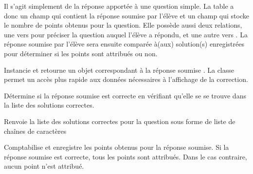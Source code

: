 \documentclass[a4paper,11pt,openany,oneside]{sphinxmanual}
\begin{document}
\begin{fulllineitems}
\label{database:quiz.models.SqSubmit}
Il s'agit simplement de la réponse apportée à une question simple. La table
a donc un champ  qui contient la réponse soumise par l'élève et un champ
 qui stocke le nombre de points obtenus pour la question. Elle possède
aussi deux relations, une vers  pour préciser la question auquel
l'élève a répondu, et une autre vers . La réponse soumise par l'élève
sera ensuite comparée à(aux) solution(s) enregistrées pour déterminer si les points
sont attribués ou non.

\begin{fulllineitems}
\label{database:quiz.models.SqSubmit.build_correct}
Instancie et retourne un objet  correspondant à la réponse soumise .
La classe  permet un accès plus rapide aux données nécessaires à
l'affichage de la correction.

\end{fulllineitems}


\begin{fulllineitems}
\label{database:quiz.models.SqSubmit.correct}
Détermine si la réponse soumise est correcte en vérifiant qu'elle se
se trouve dans la liste des solutions correctes.

\end{fulllineitems}


\begin{fulllineitems}
\label{database:quiz.models.SqSubmit.get_corrections}
Renvoie la liste des solutions correctes pour la question sous forme de liste de
chaînes de caractères

\end{fulllineitems}


\begin{fulllineitems}
\label{database:quiz.models.SqSubmit.save_result}
Comptabilise et enregistre les points obtenus pour la réponse soumise. Si la réponse soumise
est correcte, tous les points sont attribués. Dans le cas contraire,
aucun point n'est attribué.


\end{fulllineitems}
\end{fulllineitems}
\end{document}

